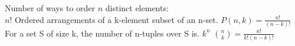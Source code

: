 Number of ways to order $n$ distinct elements:\\
$n! $
Ordered arrangements of a k-element subset of an n-set.
$P(n,k)=\frac{n!}{(n-k)!}$
For a set S of size k, the number of n-tuples over S is.
$k^n$
$\binom{n}{k}=\frac{n!}{k!(n-k)!}$



